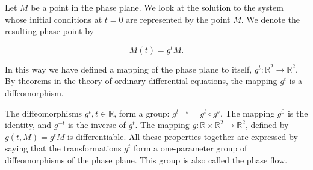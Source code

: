 Let $M$ be a point in the phase plane. We look at the solution to the system whose initial conditions at $t = 0$ are represented by the point $M$. We denote the resulting phase point by

$$M(t) = g^t M.$$

In this way we have defined a mapping of the phase plane to itself, $g^t: \mathbb{R}^2 \to \mathbb{R}^2$. By theorems in the theory of ordinary differential equations, the mapping $g^t$ is a diffeomorphism.

The diffeomorphisms $g^t, t \in \mathbb{R}$, form a group: $g^{t+s} = g^t \circ g^s$. The mapping $g^0$ is the identity, and $g^{-t}$ is the inverse of $g^t$. The mapping $g: \mathbb{R} \times \mathbb{R}^2 \rightarrow \mathbb{R}^2$, defined by $g(t, M) = g^t M$ is differentiable. All these properties together are expressed by saying that the transformations $g^t$ form a one-parameter group of diffeomorphisms of the phase plane. This group is also called the phase flow.
